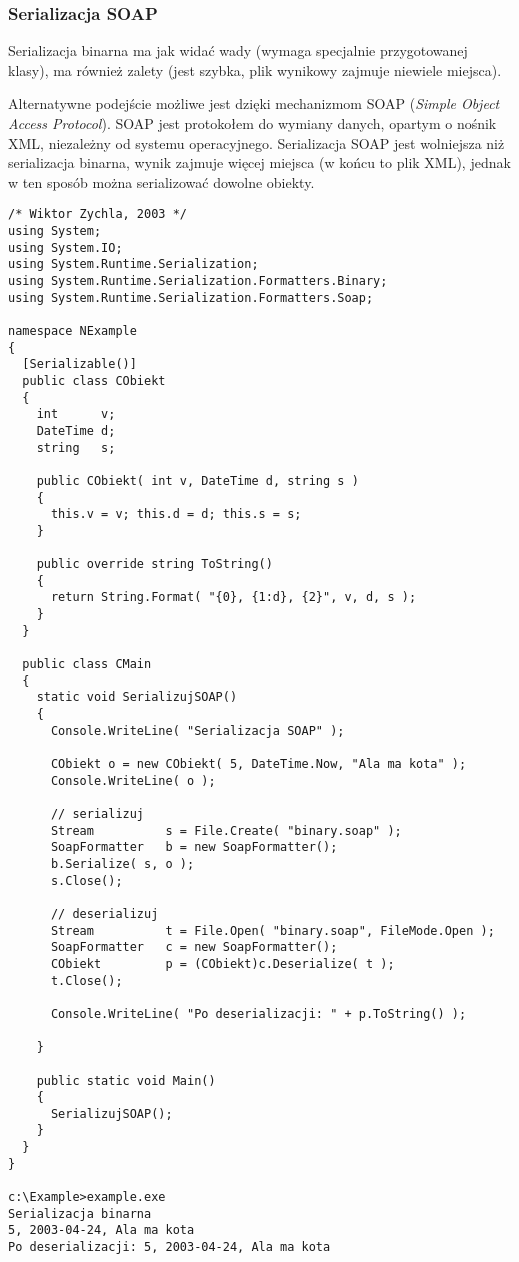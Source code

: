 \subsubsection{Serializacja SOAP}

Serializacja binarna ma jak widać wady (wymaga specjalnie przygotowanej klasy), ma również zalety
(jest szybka, plik wynikowy zajmuje niewiele miejsca). 

Alternatywne podejście możliwe jest dzięki
mechanizmom SOAP ({\em Simple Object Access Protocol}). SOAP jest protokołem do wymiany danych,
opartym o nośnik XML, niezależny od systemu operacyjnego. Serializacja SOAP jest wolniejsza niż
serializacja binarna, wynik zajmuje więcej miejsca (w końcu to plik XML), jednak w ten sposób
można serializować dowolne obiekty.

\begin{scriptsize}
\begin{verbatim}
/* Wiktor Zychla, 2003 */
using System;
using System.IO;
using System.Runtime.Serialization;
using System.Runtime.Serialization.Formatters.Binary;
using System.Runtime.Serialization.Formatters.Soap;

namespace NExample
{
  [Serializable()]
  public class CObiekt 
  {
    int      v;
    DateTime d;
    string   s;
	 
    public CObiekt( int v, DateTime d, string s )
    {
      this.v = v; this.d = d; this.s = s;
    }
    
    public override string ToString()
    {
      return String.Format( "{0}, {1:d}, {2}", v, d, s );
    }
  }

  public class CMain
  {
    static void SerializujSOAP()
    {
      Console.WriteLine( "Serializacja SOAP" );

      CObiekt o = new CObiekt( 5, DateTime.Now, "Ala ma kota" );
      Console.WriteLine( o );

      // serializuj
      Stream          s = File.Create( "binary.soap" );
      SoapFormatter   b = new SoapFormatter();
      b.Serialize( s, o );
      s.Close();

      // deserializuj
      Stream          t = File.Open( "binary.soap", FileMode.Open );
      SoapFormatter   c = new SoapFormatter();
      CObiekt         p = (CObiekt)c.Deserialize( t );
      t.Close();

      Console.WriteLine( "Po deserializacji: " + p.ToString() );

    }

    public static void Main()
    {
      SerializujSOAP();
    }
  }
}

c:\Example>example.exe
Serializacja binarna
5, 2003-04-24, Ala ma kota
Po deserializacji: 5, 2003-04-24, Ala ma kota
\end{verbatim}
\end{scriptsize}

